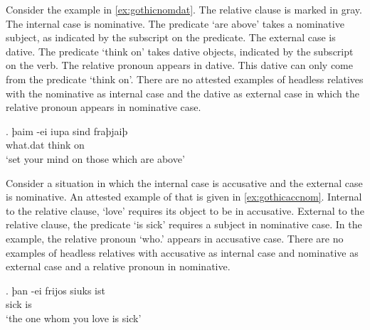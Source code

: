 
Consider the example in \ref{ex:gothicnomdat}. The relative clause is marked in gray.
The internal case is nominative. The predicate  `are above' takes a nominative subject, as indicated by the subscript on the predicate.
The external case is dative. The predicate  `think on' takes dative objects, indicated by the subscript on the verb.
The relative pronoun  appears in dative. This dative can only come from the predicate  `think on'.
There are no attested examples of headless relatives with the nominative as internal case and the dative as external case in which the relative pronoun appears in nominative case.

\exg. þaim -ei iupa sind fraþjaiþ \\
 what.\ac{dat}    {think on}\scsub{[dat]}\\
 `set your mind on those which are above' \label{ex:gothicnomdat}

Consider a situation in which the internal case is accusative and the external case is nominative. An attested example of that is given in  \ref{ex:gothicaccnom}. Internal to the relative clause,  `love' requires its object to be in accusative. External to the relative clause, the predicate  `is sick' requires a subject in nominative case. In the example, the relative pronoun  `who.' appears in accusative case. There are no examples of headless relatives with accusative as internal case and nominative as external case and a relative pronoun in nominative.

\exg. þan -ei frijos siuks ist\\
    sick is\scsub{[nom]}\\
 `the one whom you love is sick' \label{ex:gothicaccnom}

